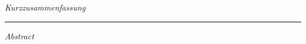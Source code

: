 \clearpage
{\normalfont
\color{uniblau}
\huge\sffamily\itshape
Kurzzusammenfassung
}



\vfill

\rule{\textwidth}{0.4pt}

\vspace{1cm}

{\normalfont
\color{uniblau}
\huge\sffamily\itshape
Abstract
}



\vfill